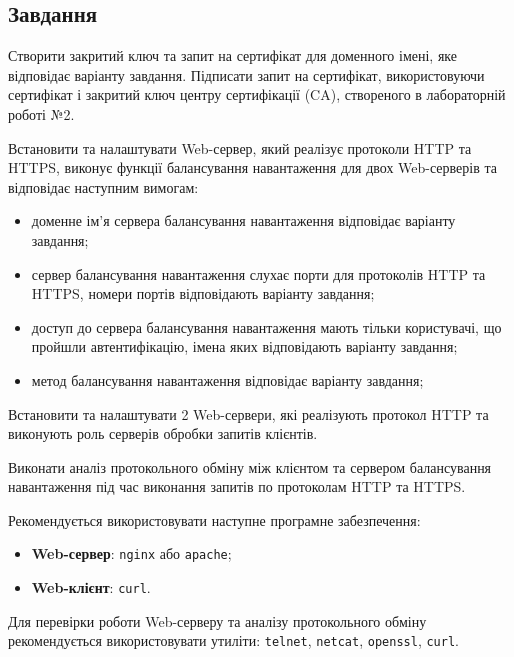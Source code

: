 \documentclass[14pt, a4paper]{extreport}
\begin{document}
	\subsection*{Завдання}
	
	Створити закритий ключ та запит на сертифікат для доменного імені, яке відповідає варіанту завдання. Підписати запит на сертифікат, використовуючи сертифікат і закритий ключ центру сертифікації (CA), створеного в лабораторній роботі №2.
	
	Встановити та налаштувати Web-сервер, який реалізує протоколи HTTP та HTTPS, виконує функції балансування навантаження для двох Web-серверів та відповідає наступним вимогам:
	
	\begin{itemize}
		\item доменне ім’я сервера балансування навантаження відповідає варіанту завдання;
		
		\item сервер балансування навантаження слухає порти для протоколів HTTP та HTTPS, номери портів відповідають варіанту завдання;
		
		\item доступ до сервера балансування навантаження мають тільки користувачі, що пройшли автентифікацію, імена яких відповідають варіанту завдання;
		
		\item метод балансування навантаження відповідає варіанту завдання;
	\end{itemize}
	
	Встановити та налаштувати 2 Web-сервери, які реалізують протокол HTTP та виконують роль серверів обробки запитів клієнтів.
	
	Виконати аналіз протокольного обміну між клієнтом та сервером балансування навантаження під час виконання запитів по протоколам HTTP та HTTPS.
	
	Рекомендується використовувати наступне програмне забезпечення:
	
	\begin{itemize}
		\item \textbf{Web-сервер}: \texttt{nginx} або \texttt{apache};
		
		\item \textbf{Web-клієнт}: \texttt{curl}.
	\end{itemize}
	
	Для перевірки роботи Web-серверу та аналізу протокольного обміну рекомендується використовувати утиліти: \texttt{telnet}, \texttt{netcat}, \texttt{openssl}, \texttt{curl}.
	
\end{document}
